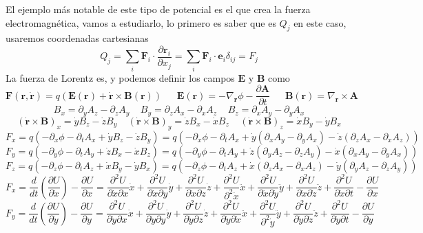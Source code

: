 El ejemplo más notable de este tipo de potencial es el que crea la fuerza electromagnética, vamos a estudiarlo, lo primero es saber que es $Q_j$ en este caso, usaremos coordenadas cartesianas
\begin{equation} \label{2.1.1}
    Q_j = \sum_i \mathbf{F}_i \cdot \frac{\partial \mathbf{r}_i}{\partial x_j} = \sum_i \mathbf{F}_i \cdot \mathbf{e}_i \delta_{ij} = F_j
\end{equation} 
La fuerza de Lorentz es, y podemos definir los campos $\mathbf{E}$ y $\mathbf{B}$ como 
\begin{equation} \label{2.1.1}
    \mathbf{F}(\mathbf{r},\dot{\mathbf{r}}) = q(\mathbf{E}(\mathbf{r})+\dot{\mathbf{r}} \times \mathbf{B}(\mathbf{r})) \ \ \ \ \ \ \ \mathbf{E}(\mathbf{r}) = -\nabla_\mathbf{r} \phi -\frac{\partial \mathbf{A}}{\partial t}  \ \ \ \ \ \ \ \mathbf{B}(\mathbf{r}) = \nabla_\mathbf{r} \times \mathbf{A}
\end{equation} 
\[
    B_x = \partial_y A_z - \partial_z A_y \ \ \ \ \ B_y = \partial_z A_x-\partial_x A_z \ \ \ \ \ B_z = \partial_x A_y - \partial_y A_x
\]
\[
    (\dot{\mathbf{r}} \times \mathbf{B})_x= \dot{y}B_z - \dot{z}B_y \ \ \ \ \ (\dot{\mathbf{r}} \times \mathbf{B})_y = \dot{z}B_x - \dot{x}B_z \ \ \ \ \ (\dot{\mathbf{r}} \times \mathbf{B})_z = \dot{x}B_y - \dot{y}B_x
\]
\[F_x = q\left(-\partial_x \phi - \partial_t A_x +\dot{y}B_z - \dot{z}B_y\right) = q\left(-\partial_x \phi - \partial_t A_x +\dot{y}(\partial_x A_y - \partial_y A_x) - \dot{z}(\partial_z A_x-\partial_x A_z)\right)\]
\[F_y = q\left(-\partial_y \phi - \partial_t A_y +\dot{z}B_x - \dot{x}B_z\right) = q\left(-\partial_y \phi - \partial_t A_y +\dot{z}(\partial_y A_z - \partial_z A_y) - \dot{x}(\partial_x A_y-\partial_y A_x)\right)\]
\[F_z = q\left(-\partial_z \phi - \partial_t A_z +\dot{x}B_y - \dot{y}B_x\right) = q\left(-\partial_z \phi - \partial_t A_z +\dot{x}(\partial_z A_x-\partial_x A_z) - \dot{y}(\partial_y A_z - \partial_z A_y)\right)\]
\[F_x = \frac{d}{dt}\left(\frac{\partial U}{\partial \dot{x}}\right)-\frac{\partial U}{\partial x} = \frac{\partial^2 U}{\partial \dot{x}\partial x} \dot{x} + \frac{\partial^2 U}{\partial \dot{x}\partial y} \dot{y} + \frac{\partial^2 U}{\partial \dot{x}\partial z} \dot{z} + \frac{\partial^2 U}{\partial^2 \dot{x}} \ddot{x} + \frac{\partial^2 U}{\partial \dot{x}\partial \dot{y}} \ddot{y} + \frac{\partial^2 U}{\partial \dot{x}\partial \dot{z}} \ddot{z}+\frac{\partial^2 U}{\partial \dot{x}\partial t} -\frac{\partial U}{\partial x}\]
\[F_y = \frac{d}{dt}\left(\frac{\partial U}{\partial \dot{y}}\right)-\frac{\partial U}{\partial y} = \frac{\partial^2 U}{\partial \dot{y}\partial x} \dot{x} + \frac{\partial^2 U}{\partial \dot{y}\partial y} \dot{y} + \frac{\partial^2 U}{\partial \dot{y}\partial z} \dot{z} + \frac{\partial^2 U}{\partial \dot{y} \partial \dot{x}} \ddot{x} + \frac{\partial^2 U}{\partial^2 \dot{y}} \ddot{y} + \frac{\partial^2 U}{\partial \dot{y}\partial \dot{z}} \ddot{z}+\frac{\partial^2 U}{\partial \dot{y}\partial t} -\frac{\partial U}{\partial y}\]
